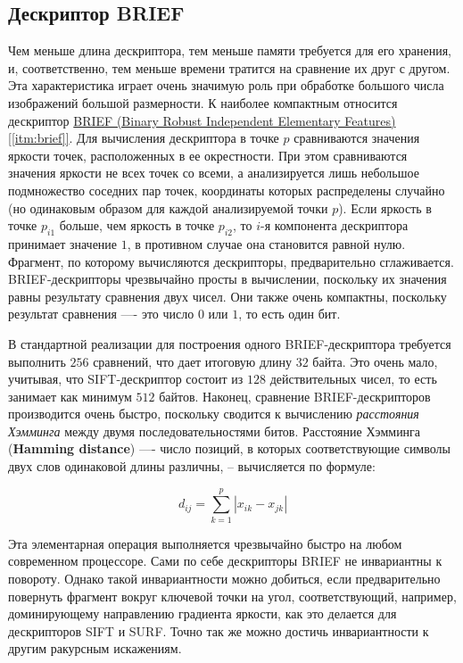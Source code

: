 \subsection{Дескриптор BRIEF}

Чем меньше длина дескриптора, тем меньше памяти требуется для его хранения, и, соответственно, тем меньше времени тратится на сравнение их друг с другом. Эта характеристика играет очень значимую роль при обработке большого числа изображений большой размерности. К наиболее компактным относится дескриптор \hyperref[itm:brief]{ BRIEF (Binary Robust Independent Elementary Features) [\ref{itm:brief}]}. Для вычисления дескриптора в точке $p$ сравниваются значения яркости точек, расположенных в ее окрестности. При этом сравниваются значения яркости не всех точек со всеми, а анализируется лишь небольшое подмножество соседних пар точек, координаты которых распределены случайно (но одинаковым образом для каждой анализируемой точки $p$). Если яркость в точке $p_{i1}$ больше, чем яркость в точке $p_{i2}$, то $i$-я компонента дескриптора принимает значение $1$, в противном случае она становится равной нулю. Фрагмент, по которому вычисляются дескрипторы, предварительно сглаживается. BRIEF-дескрипторы чрезвычайно просты в вычислении, поскольку их значения равны результату сравнения двух чисел. Они также очень компактны, поскольку результат сравнения —- это число $0$ или $1$, то есть один бит.

В стандартной реализации для построения одного BRIEF-дескриптора требуется выполнить $256$ сравнений, что дает итоговую длину $32$ байта. Это очень мало, учитывая, что SIFT-дескриптор состоит из $128$ действительных чисел, то есть занимает как минимум $512$ байтов. Наконец, сравнение BRIEF-дескрипторов производится очень быстро, поскольку сводится к вычислению \textit{расстояния Хэмминга} между двумя последовательностями битов. Расстояние Хэмминга (\textbf{Hamming distance}) —- число позиций, в которых соответствующие символы двух слов одинаковой длины различны, -- вычисляется по формуле:

\begin{equation}
    d_{ij} = \sum_{k=1}^{p}|x_{ik} - x_{jk}|
\end{equation}

Эта элементарная операция выполняется чрезвычайно быстро на любом современном процессоре. Сами по себе дескрипторы BRIEF не инвариантны к повороту. Однако такой инвариантности можно добиться, если предварительно повернуть фрагмент вокруг ключевой точки на угол, соответствующий, например, доминирующему направлению градиента яркости, как это делается для дескрипторов SIFT и SURF. Точно так же можно достичь инвариантности к другим ракурсным искажениям.

